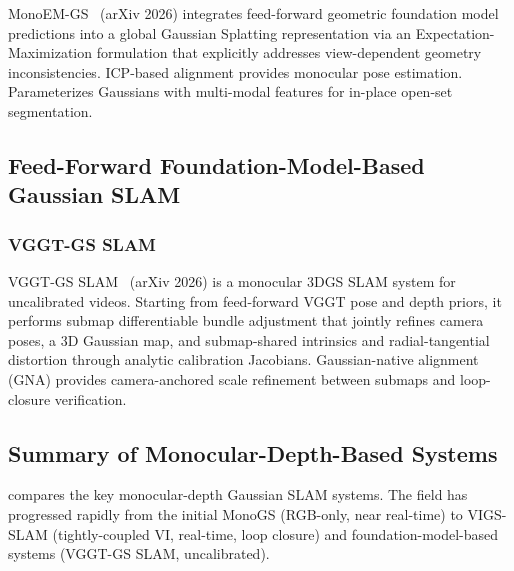 MonoEM-GS~\cite{kruzhkov2026_monoemgs} (arXiv 2026) integrates feed-forward
geometric foundation model predictions into a global Gaussian Splatting
representation via an Expectation-Maximization formulation that explicitly
addresses view-dependent geometry inconsistencies.  ICP-based alignment
provides monocular pose estimation.  Parameterizes Gaussians with
multi-modal features for in-place open-set segmentation.

\subsection{Feed-Forward Foundation-Model-Based Gaussian SLAM}

\subsubsection{VGGT-GS SLAM}

VGGT-GS SLAM~\cite{han2026_vggtgssslam} (arXiv 2026) is a monocular 3DGS
SLAM system for uncalibrated videos.  Starting from feed-forward VGGT
pose and depth priors, it performs submap differentiable bundle adjustment
that jointly refines camera poses, a 3D Gaussian map, and
submap-shared intrinsics and radial-tangential distortion through analytic
calibration Jacobians.  Gaussian-native alignment (GNA) provides
camera-anchored scale refinement between submaps and loop-closure
verification.

\subsection{Summary of Monocular-Depth-Based Systems}

 compares the key monocular-depth Gaussian SLAM
systems.  The field has progressed rapidly from the initial MonoGS
(RGB-only, near real-time) to VIGS-SLAM (tightly-coupled VI, real-time, loop
closure) and foundation-model-based systems (VGGT-GS SLAM, uncalibrated).

